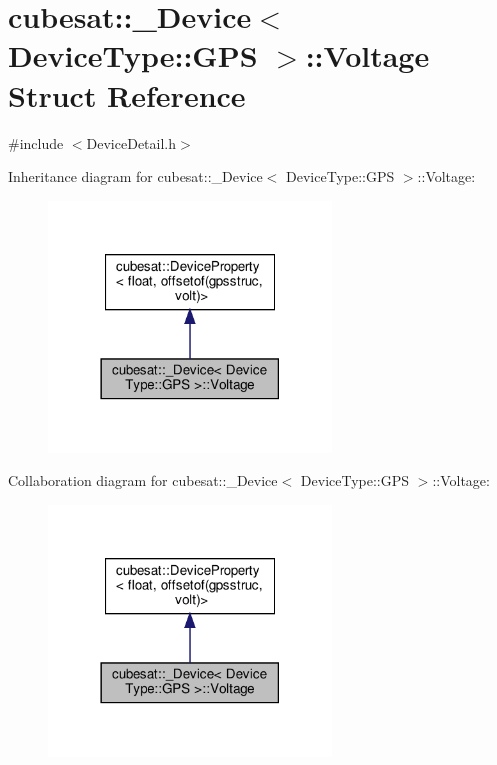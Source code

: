 \hypertarget{structcubesat_1_1__Device_3_01DeviceType_1_1GPS_01_4_1_1Voltage}{}\section{cubesat\+:\+:\+\_\+\+Device$<$ Device\+Type\+:\+:G\+PS $>$\+:\+:Voltage Struct Reference}
\label{structcubesat_1_1__Device_3_01DeviceType_1_1GPS_01_4_1_1Voltage}


{\ttfamily \#include $<$Device\+Detail.\+h$>$}



Inheritance diagram for cubesat\+:\+:\+\_\+\+Device$<$ Device\+Type\+:\+:G\+PS $>$\+:\+:Voltage\+:\nopagebreak
\begin{figure}[H]
\begin{center}
\leavevmode
\includegraphics[width=213pt]{structcubesat_1_1__Device_3_01DeviceType_1_1GPS_01_4_1_1Voltage__inherit__graph}
\end{center}
\end{figure}


Collaboration diagram for cubesat\+:\+:\+\_\+\+Device$<$ Device\+Type\+:\+:G\+PS $>$\+:\+:Voltage\+:\nopagebreak
\begin{figure}[H]
\begin{center}
\leavevmode
\includegraphics[width=213pt]{structcubesat_1_1__Device_3_01DeviceType_1_1GPS_01_4_1_1Voltage__coll__graph}
\end{center}
\end{figure}
